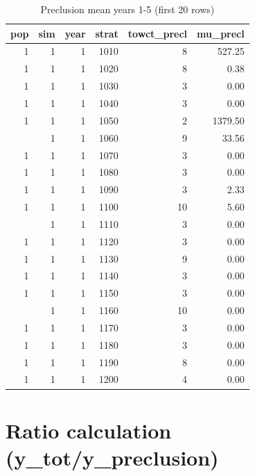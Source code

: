 \documentclass[
]{article}
\begin{document}
\begin{table}[H]

\caption{\label{tab:unnamed-chunk-9}Preclusion mean years 1-5 (first 20 rows)}
\centering
\fontsize{8}{10}\selectfont
\begin{tabular}[t]{rrrrrr}
\toprule
pop & sim & year & strat & towct\_precl & mu\_precl\\
\midrule
1 & 1 & 1 & 1010 & 8 & 527.25\\
1 & 1 & 1 & 1020 & 8 & 0.38\\
1 & 1 & 1 & 1030 & 3 & 0.00\\
1 & 1 & 1 & 1040 & 3 & 0.00\\
1 & 1 & 1 & 1050 & 2 & 1379.50\\
\addlinespace
1 & 1 & 1 & 1060 & 9 & 33.56\\
1 & 1 & 1 & 1070 & 3 & 0.00\\
1 & 1 & 1 & 1080 & 3 & 0.00\\
1 & 1 & 1 & 1090 & 3 & 2.33\\
1 & 1 & 1 & 1100 & 10 & 5.60\\
\addlinespace
1 & 1 & 1 & 1110 & 3 & 0.00\\
1 & 1 & 1 & 1120 & 3 & 0.00\\
1 & 1 & 1 & 1130 & 9 & 0.00\\
1 & 1 & 1 & 1140 & 3 & 0.00\\
1 & 1 & 1 & 1150 & 3 & 0.00\\
\addlinespace
1 & 1 & 1 & 1160 & 10 & 0.00\\
1 & 1 & 1 & 1170 & 3 & 0.00\\
1 & 1 & 1 & 1180 & 3 & 0.00\\
1 & 1 & 1 & 1190 & 8 & 0.00\\
1 & 1 & 1 & 1200 & 4 & 0.00\\
\bottomrule
\end{tabular}
\end{table}

\section{Ratio calculation
(y\_tot/y\_preclusion)}\label{ratio-calculation-y_toty_preclusion}
\end{document}
